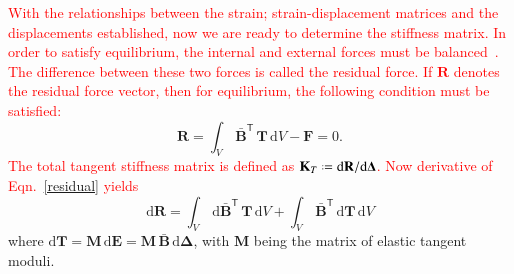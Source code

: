 \textcolor{red}{With the relationships between the strain; strain-displacement matrices and the displacements established, now we are ready to determine the stiffness matrix. In order to satisfy equilibrium, the internal and external forces must be balanced~\cite{Elseifi98}. The difference between these two forces is called the residual force. If $\mathbf{R}$ denotes the residual force vector, then for equilibrium, the following condition must be satisfied:}
\begin{equation}
\mathbf{R} = \int_{V} \, \bar{\mathbf{B}}^{\mathsf{T}} \, \mathbf{T} \, \mathrm{d} V - \mathbf{F} = 0
\label{residual}.
\end{equation}
\textcolor{red}{The total tangent stiffness matrix is defined as $\mathbf{K}_T\defeq \mathrm{d}\mathbf{R}/\mathrm{d}\boldsymbol{\Delta}$. Now derivative of Eqn.~\eqref{residual} yields}
\begin{equation}
\mathrm{d} \mathbf{R} = \int_{V} \, \mathrm{d} \bar{\mathbf{B}}^{\mathsf{T}} \, \mathbf{T} \, \mathrm{d} V + \int_{V} \, \bar{\mathbf{B}}^{\mathsf{T}} \, \mathrm{d} \mathbf{T} \, \mathrm{d} V 
\label{diffresidual}
\end{equation}
where $\mathrm{d} \mathbf{T} = \mathbf{M} \, \mathrm{d} \mathbf{E} = \mathbf{M} \,  \bar{\mathbf{B}} \, \mathrm{d} \boldsymbol{\Delta}$, with $\mathbf{M}$ being the matrix of elastic tangent moduli. 

